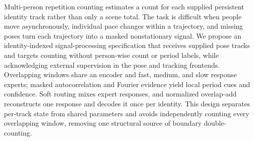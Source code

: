Multi-person repetition counting estimates a count for each supplied persistent
identity track rather than only a scene total. The task is difficult when people move
asynchronously, individual pace changes within a trajectory, and missing poses
turn each trajectory into a masked nonstationary signal. We propose an
identity-indexed signal-processing specification that receives supplied pose
tracks and targets counting without person-wise count or period labels, while
acknowledging external supervision in the pose and tracking frontends.
Overlapping windows share an encoder and fast, medium, and slow response
experts; masked autocorrelation and Fourier evidence yield local period cues
and confidence. Soft routing mixes expert responses, and normalized overlap-add
reconstructs one response and decodes it once per identity. This design
separates per-track state from shared parameters and avoids independently
counting every overlapping window, removing one structural source of boundary
double-counting. \ControlledAbstractResult
